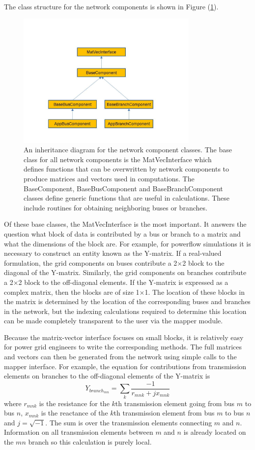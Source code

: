 \documentclass[preprint]{acm_proc_article-sp}
\begin{document}
The class structure for the network components is shown in Figure
(\ref{classes}). 
\begin{figure}
\centering
\includegraphics[width=3.5in,keepaspectratio=true]{./FigNC}
\caption{\label{classes} An inheritance diagram for the network component
classes. The base class for all network components is the MatVecInterface which
defines functions that can be overwritten by network components to produce
matrices and vectors used in computations. The BaseComponent, BaseBusComponent
and BaseBranchComponent classes define generic functions that are useful in
calculations. These include routines for obtaining neighboring buses or
branches.}
\end{figure}
Of these base classes, the MatVecInterface is the most important. It answers the
question what block of data is contributed by a bus or branch to a matrix and what
the dimensions of the block are. For example, for powerflow simulations it is
necessary to construct an entity known as the Y-matrix.  If a real-valued formulation,
the grid components on buses contribute a 2$\times$2 block to the
diagonal of the Y-matrix. Similarly, the grid components on branches contribute a 2$\times$2
block to the off-diagonal elements. If the Y-matrix is expressed as a complex
matrix, then the blocks are of size 1$\times$1. The location of these blocks in the
matrix is determined by the location of the corresponding buses and branches in the
network, but the indexing calculations required to determine this location can be made
completely transparent to the user via the mapper module. 

Because the matrix-vector interface focuses on small blocks, it is relatively easy
for power grid engineers to write the corresponding methods. The full matrices and vectors
can then be generated from the network using simple calls to the mapper interface.
For example, the equation for contributions from transmission elements on
branches to the off-diagonal elements of the Y-matrix is\cite{PF}
\begin{equation}
\label{ydiag}
Y_{branch_{mn}} = \sum_{k}\frac{-1}{r_{mnk}+jx_{mnk}}
\end{equation}
where $r_{mnk}$ is the resistance for the $k$th transmission element going from
bus $m$ to bus $n$, $x_{mnk}$ is the reactance of the $k$th transmission element
from bus $m$ to bus $n$ and $j=\sqrt{-1}$.  The sum is over the transmission
elements connecting $m$ and $n$. Information on all transmission
elements between $m$ and $n$ is already located on the $mn$ branch so this
calculation is purely local.
\end{document}
